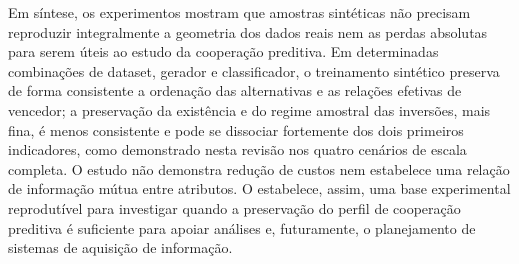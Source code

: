Em síntese, os experimentos mostram que amostras sintéticas não precisam reproduzir integralmente a geometria dos dados reais nem as perdas absolutas para serem úteis ao estudo da cooperação preditiva. Em determinadas combinações de dataset, gerador e classificador, o treinamento sintético preserva de forma consistente a ordenação das alternativas e as relações efetivas de vencedor; a preservação da existência e do regime amostral das inversões, mais fina, é menos consistente e pode se dissociar fortemente dos dois primeiros indicadores, como demonstrado nesta revisão nos quatro cenários de escala completa. O estudo não demonstra redução de custos nem estabelece uma relação de informação mútua entre atributos. O \CoInfoSim{} estabelece, assim, uma base experimental reprodutível para investigar quando a preservação do perfil de cooperação preditiva é suficiente para apoiar análises e, futuramente, o planejamento de sistemas de aquisição de informação.
